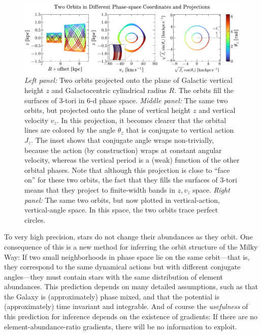 \documentclass[modern]{aastex63}
\begin{document}
\begin{figure}[!tp]
  \begin{mdframed}
  \color{captiongray}
  \begin{center}
  \includegraphics[width=\textwidth]{zvz-orbit-demo.pdf}
  \end{center}
  \caption{%
    \textsl{Left panel:} Two orbits projected onto the plane of
    Galactic vertical height $z$ and Galactocentric cylindrical radius
    $R$. The orbits fill the surfaces of 3-tori in 6-d phase space.
    \textsl{Middle panel:} The same two orbits, but projected onto the plane
    of vertical height $z$ and vertical velocity $v_z$. In this projection,
    it becomes clearer that the orbital lines are
    colored by the angle $\theta_z$ that is conjugate to vertical action $J_z$.
    The inset shows that conjugate angle wraps non-trivially, because the action
    (by construction) wraps at constant angular velocity, whereas the vertical period
    is a (weak) function of the other orbital phases.
    Note that although this projection is close to ``face on'' for these two
    orbits, the fact that they fills the surfaces of 3-tori means that they
    project to finite-width bands in $z, v_z$ space.
    \textsl{Right panel:} The same two orbits, but now plotted in vertical-action,
    vertical-angle space. In this space, the two orbits trace perfect circles.
  \label{fig:zvz-demo}
  }
  \end{mdframed}
\end{figure}

To very high precision, stars do not change their abundances as they orbit.
One consequence of this is a new method for inferring the orbit structure of the
Milky Way:
If two small neighborhoods in phase space lie on the same orbit---that is, they
correspond to the same dynamical actions but with different conjugate
angles---they must contain stars with the same distribution of element
abundances.
This prediction depends on many detailed assumptions, such as that the Galaxy is
(approximately) phase mixed, and that the potential is (approximately) time
invariant and integrable.
And of course the \emph{usefulness} of this prediction for inference depends on
the existence of gradients: If there are no element-abundance-ratio gradients,
there will be no information to exploit.
\end{document}
